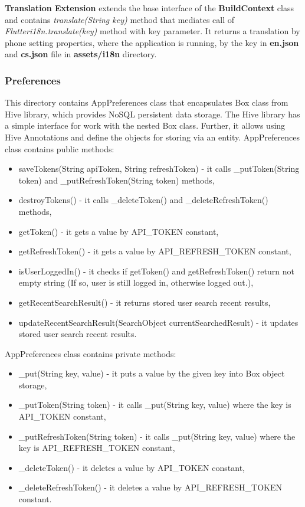 \textbf{Translation Extension} extends the base interface of the \textbf{BuildContext} class and contains \textit{translate(String key)} method that mediates call of \textit{Flutteri18n.translate(key)} method with key parameter.
It returns a translation by phone setting properties, where the application is running, by the key in  \textbf{en.json} and \textbf{cs.json} file in \textbf{assets/i18n} directory.


\subsubsection{Preferences}\label{subsubsec:preferences}
This directory contains AppPreferences class that encapsulates Box class from Hive library, which provides NoSQL persistent data storage.
The Hive library has a simple interface for work with the nested Box class.
Further, it allows using Hive Annotations and define the objects for storing via an entity.
AppPreferences class contains public methods:
\begin{itemize}
    \item saveTokens(String apiToken, String refreshToken) - it calls \_putToken(String token) and \_putRefreshToken(String token) methods,
    \item destroyTokens() - it calls \_deleteToken() and \_deleteRefreshToken() methods,
    \item getToken() - it gets a value by API\_TOKEN constant,
    \item getRefreshToken() - it gets a value by API\_REFRESH\_TOKEN constant,
    \item isUserLoggedIn() - it checks if getToken() and getRefreshToken() return not empty string (If so, user is still logged in, otherwise logged out.),
    \item getRecentSearchResult() - it returns stored user search recent results,
    \item updateRecentSearchResult(SearchObject currentSearchedResult) - it updates stored user search recent results.
\end{itemize}
AppPreferences class contains private methods:
\begin{itemize}
    \item \_put(String key, value) - it puts a value by the given key into Box object storage,
    \item \_putToken(String token) - it calls \_put(String key, value) where the key is API\_TOKEN constant,
    \item \_putRefreshToken(String token) - it calls \_put(String key, value) where the key is API\_REFRESH\_TOKEN constant,
    \item \_deleteToken() - it deletes a value by API\_TOKEN constant,
    \item \_deleteRefreshToken() - it deletes a value by API\_REFRESH\_TOKEN constant.
\end{itemize}
